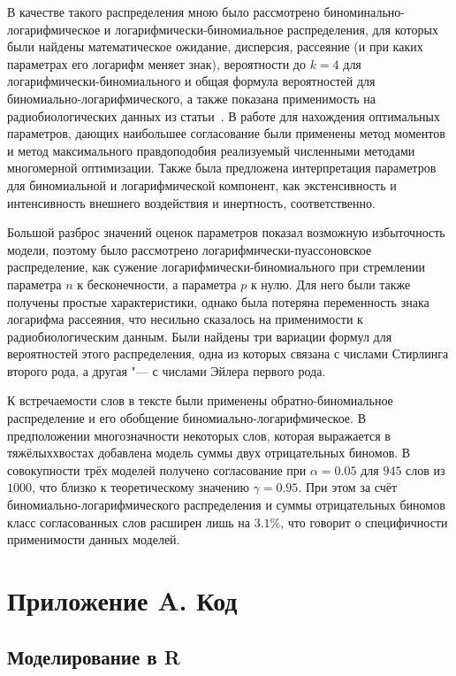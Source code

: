 \documentclass[12pt, specialist, subf, substylefile = spbu_report.rtx]{disser}
\begin{document}
	В качестве такого распределения мною было рассмотрено биноминально-логарифмическое и логарифмически-биномиальное распределения, для которых были найдены математическое ожидание, дисперсия, рассеяние (и при каких параметрах его логарифм меняет знак), вероятности до $ k = 4 $ для логарифмически-биномиального и общая формула вероятностей для биномиально-логарифмического, а также показана применимость на радиобиологических данных из статьи~\cite{bib:alexeeva2008}. В работе для нахождения оптимальных параметров, дающих наибольшее согласование были применены метод моментов и метод максимального правдоподобия реализуемый численными методами многомерной оптимизации. Также была предложена интерпретация параметров для биномиальной и логарифмической компонент, как экстенсивность и интенсивность внешнего воздействия и инертность, соответственно.
	
	Большой разброс значений оценок параметров показал возможную избыточность модели, поэтому было рассмотрено логарифмически-пуассоновское распределение, как сужение логарифмически-биномиального при стремлении параметра $n$ к бесконечности, а параметра $p$ к нулю. Для него были также получены простые характеристики, однако была потеряна переменность знака логарифма рассеяния, что несильно сказалось на применимости к радиобиологическим данным. Были найдены три вариации формул для вероятностей этого распределения, одна из которых связана с числами Стирлинга второго рода, а другая "--- с числами Эйлера первого рода.
	
	К встречаемости слов в тексте были применены обратно-биномиальное распределение и его обобщение биномиально-логарифмическое. В предположении многозначности некоторых слов, которая выражается в \glqq тяжёлых\grqq хвостах добавлена модель суммы двух отрицательных биномов. В совокупности трёх моделей получено согласование при $\alpha = 0.05$ для $945$ слов из $1000$, что близко к теоретическому значению $\gamma = 0.95$. При этом за счёт биномиально-логарифмического распределения и суммы отрицательных биномов класс согласованных слов расширен лишь на $3.1 \%$, что говорит о специфичности применимости данных моделей.
	
	
	
	
	\appendix
	
	\chapter*{Приложение A. Код}
	
	\section{Моделирование в R}
	
\end{document}
